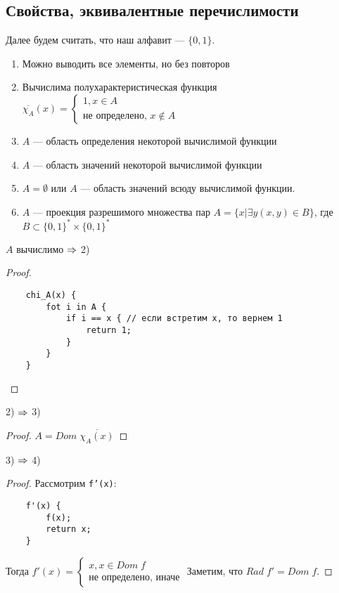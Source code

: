 
\subsection{Свойства, эквивалентные перечислимости}
Далее будем считать, что наш алфавит --- \(\{0, 1\}\).
\begin{enumerate}
    \item Можно выводить все элементы, но без повторов
    \item Вычислима полухарактеристическая функция \(\overline{\chi_A}(x) = \left\{\begin{array}{l}
        1, x \in A \\
        \text{не определено, }x \notin A
    \end{array}\right.\)
    \item \(A\) --- область определения некоторой вычислимой функции
    \item \(A\) --- область значений некоторой вычислимой функции
    \item \(A = \emptyset\) или \(A\) --- область значений всюду вычислимой функции.
    \item \(A\) --- проекция разрешимого множества пар \(A = \{x | \exists y (x, y) \in B\}\), где \(B \subset \{0, 1\}^*\times \{0, 1\}^*\)
\end{enumerate}

\begin{proposition}
    \(A\) вычислимо \(\Rightarrow\) 2)
\end{proposition}
\begin{proof}\indent
    \begin{verbatim}
    chi_A(x) {
        fot i in A {
            if i == x { // если встретим x, то вернем 1
                return 1;
            }
        }
    } 
    \end{verbatim}
\end{proof}
\begin{proposition}
    2) \(\Rightarrow\) 3)
\end{proposition}
\begin{proof}
    \(A = Dom\;\overline{\chi_A(x)}\)
\end{proof}
\begin{proposition}
    3) \(\Rightarrow\) 4)
\end{proposition}
\begin{proof}
    Рассмотрим \texttt{f'(x)}:
    \begin{verbatim}
    f'(x) {
        f(x);
        return x;
    }
    \end{verbatim}
    Тогда \(f'(x) = \left\{\begin{array}{l}
        x, x \in Dom\;f \\
        \text{не определено, иначе}
    \end{array}\right.\)
    Заметим, что \(Rad\;f' = Dom\;f\).
\end{proof}
    
